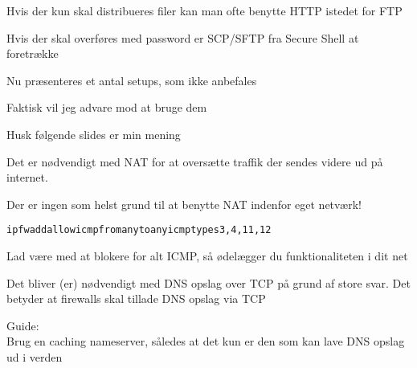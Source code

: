 
\begin{list1}
\item Hvis der kun skal distribueres filer kan man ofte benytte HTTP istedet for FTP
\item Hvis der skal overføres med password er SCP/SFTP fra Secure Shell at foretrække
\end{list1}



\begin{list1}
\item Nu præsenteres et antal setups, som ikke anbefales
\item Faktisk vil jeg advare mod at bruge dem
\item Husk følgende slides er min mening
\end{list1}



\begin{list1}
\item Det er nødvendigt med NAT for at oversætte traffik der sendes videre
ud på internet.
\vskip 1cm
\item Der er ingen som helst grund til at benytte NAT indenfor eget netværk!
\end{list1}


\begin{alltt}
ipfw add allow icmp from any to any icmptypes 3,4,11,12
\end{alltt}

\begin{list1}
\item Lad være med at blokere for alt ICMP, så ødelægger du funktionaliteten i dit net 
\vskip 1cm
\item \end{list1}


\begin{list1}
\item Det bliver (er) nødvendigt med DNS opslag over TCP på grund af store svar. Det betyder at firewalls skal tillade DNS opslag via TCP
\vskip 1cm
\item 
\item Guide:\\
Brug en caching nameserver, således at det kun er den som kan lave DNS opslag ud i verden

\end{list1}

